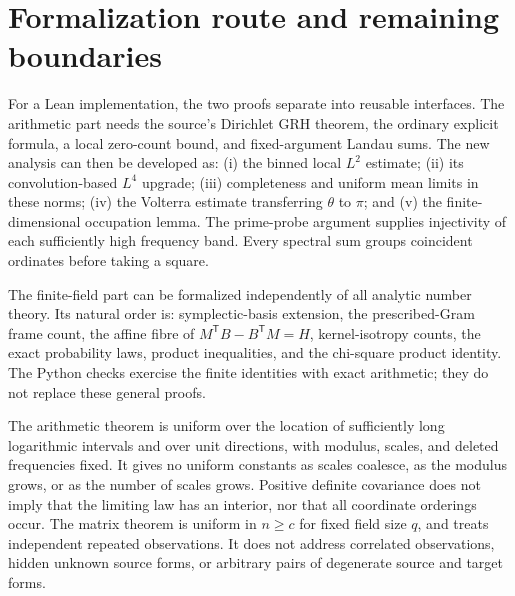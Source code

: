 \documentclass[11pt,letterpaper]{article}
\numberwithin{equation}{section}
\theoremstyle{definition}
\theoremstyle{remark}
\begin{document}




\section{Formalization route and remaining boundaries}\label{sec:formalization}
For a Lean implementation, the two proofs separate into reusable interfaces.
The arithmetic part needs the source's Dirichlet GRH theorem, the ordinary
explicit formula, a local zero-count bound, and fixed-argument Landau sums.
The new analysis can then be developed as: (i) the binned local $L^2$ estimate;
(ii) its convolution-based $L^4$ upgrade; (iii) completeness and uniform mean
limits in these norms; (iv) the Volterra estimate transferring $\theta$ to
$\pi$; and (v) the finite-dimensional occupation lemma. The prime-probe
argument supplies injectivity of each sufficiently high frequency band.
Every spectral sum groups coincident ordinates before taking a square.

The finite-field part can be formalized independently of all analytic
number theory. Its natural order is: symplectic-basis extension, the
prescribed-Gram frame count, the affine fibre of $M^{\mathsf T}B-B^{\mathsf T}M=H$,
kernel-isotropy counts, the exact probability laws, product inequalities,
and the chi-square product identity. The Python checks exercise the finite
identities with exact arithmetic; they do not replace these general proofs.

The arithmetic theorem is uniform over the location of sufficiently long
logarithmic intervals and over unit directions, with modulus, scales, and
deleted frequencies fixed. It gives no uniform constants as scales coalesce,
as the modulus grows, or as the number of scales grows. Positive definite
covariance does not imply that the limiting law has an interior, nor that all
coordinate orderings occur. The matrix theorem is uniform in $n\ge c$ for fixed
field size $q$, and treats independent repeated observations. It does not
address correlated observations, hidden unknown source forms, or arbitrary
pairs of degenerate source and target forms.



\end{document}
